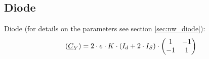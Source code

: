 \subsection{Diode}

Diode (for details on the parameters see section \ref{sec:nw_diode}):
\begin{equation}
(\underline{C}_Y)
 = 2\cdot e\cdot K\cdot \left(I_{d} + 2\cdot I_{S}\right)\cdot
\begin{pmatrix}
   1 & -1\\
  -1 &  1\\
\end{pmatrix}\\
\end{equation}

